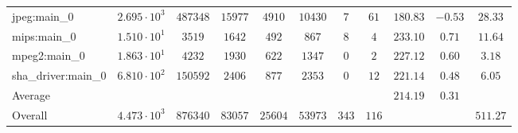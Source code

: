\begin{tabular}{|l|c|c|c|c|c|c|c|c|c|c|}
jpeg:main\_0            & $ 2.695 \cdot 10^{3}  $ & $ 487348 $ & $ 15977 $ & $ 4910  $ & $ 10430 $ & $ 7   $ & $ 61  $ & $ 180.83      $ & $ -0.53   $ & $ 28.33   $ \\
mips:main\_0            & $ 1.510 \cdot 10^{1}  $ & $ 3519   $ & $ 1642  $ & $ 492   $ & $ 867   $ & $ 8   $ & $ 4   $ & $ 233.10      $ & $ 0.71    $ & $ 11.64   $ \\
mpeg2:main\_0           & $ 1.863 \cdot 10^{1}  $ & $ 4232   $ & $ 1930  $ & $ 622   $ & $ 1347  $ & $ 0   $ & $ 2   $ & $ 227.12      $ & $ 0.60    $ & $ 3.18    $ \\
sha\_driver:main\_0     & $ 6.810 \cdot 10^{2}  $ & $ 150592 $ & $ 2406  $ & $ 877   $ & $ 2353  $ & $ 0   $ & $ 12  $ & $ 221.14      $ & $ 0.48    $ & $ 6.05    $ \\
\hline
Average                 & $                     $ & $        $ & $       $ & $       $ & $       $ & $     $ & $     $ & $ 214.19      $ & $ 0.31    $ & $         $ \\
\hline
Overall                 & $ 4.473 \cdot 10^{3}  $ & $ 876340 $ & $ 83057 $ & $ 25604 $ & $ 53973 $ & $ 343 $ & $ 116 $ & $             $ & $         $ & $ 511.27  $ \\
\hline
\end{tabular}
